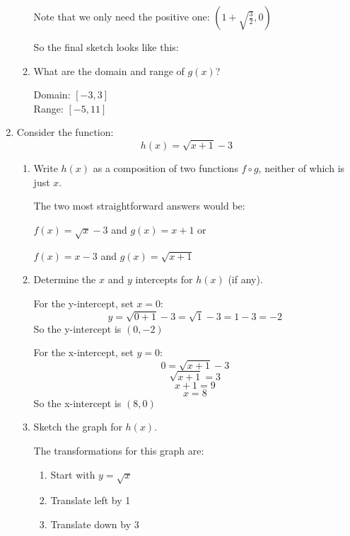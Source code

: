 \documentclass[letterpaper,12pt,fleqn]{article}
\begin{document}
\begin{enumerate}
\begin{enumerate}
    Note that we only need the positive one:
    $\left(1+\sqrt{\frac{3}{2}},0\right)$

    So the final sketch looks like this:
    

  \item What are the domain and range of $g(x)$?

    Domain: $[-3,3]$ \\
    Range: $[-5,11]$
  \end{enumerate}

\item Consider the function:
  \[h(x)=\sqrt{x+1}-3\]
  \begin{enumerate}
  \item Write $h(x)$ as a composition of two functions $f\circ g$, neither of
    which is just $x$.

    The two most straightforward answers would be:

    $f(x)=\sqrt{x}-3$ and $g(x)=x+1$ or
    
    $f(x)=x-3$ and $g(x)=\sqrt{x+1}$
    
  \item Determine the $x$ and $y$ intercepts for $h(x)$ (if any).

    For the y-intercept, set $x=0$:
    \[y=\sqrt{0+1}-3=\sqrt{1}-3=1-3=-2\]
    So the y-intercept is $(0,-2)$

    For the x-intercept, set $y=0$:
    \[0=\sqrt{x+1}-3\]
    \[\sqrt{x+1}=3\]
    \[x+1=9\]
    \[x=8\]
    So the x-intercept is $(8,0)$
    
  \item Sketch the graph for $h(x)$.

    The transformations for this graph are:
    \begin{enumerate}[label={\arabic*)}]
    \item Start with $y=\sqrt{x}$
    \item Translate left by 1
    \item Translate down by 3
    \end{enumerate}


\end{enumerate}
\end{enumerate}
\end{document}
